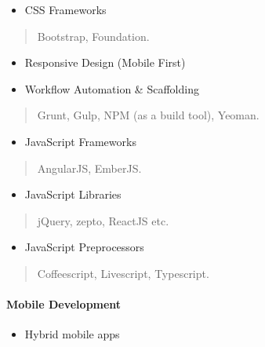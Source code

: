 \documentclass[]{article}
\providecommand{\tightlist}{%
  \setlength{\itemsep}{0pt}\setlength{\parskip}{0pt}}
\let\oldparagraph\paragraph
\renewcommand{\paragraph}[1]{\oldparagraph{#1}\mbox{}}
\begin{document}
\begin{itemize}
\tightlist
\item
  CSS Frameworks
\end{itemize}

\begin{quote}
Bootstrap, Foundation.
\end{quote}

\begin{itemize}
\item
  Responsive Design (Mobile First)
\item
  Workflow Automation \& Scaffolding
\end{itemize}

\begin{quote}
Grunt, Gulp, NPM (as a build tool), Yeoman.
\end{quote}

\begin{itemize}
\tightlist
\item
  JavaScript Frameworks
\end{itemize}

\begin{quote}
AngularJS, EmberJS.
\end{quote}

\begin{itemize}
\tightlist
\item
  JavaScript Libraries
\end{itemize}

\begin{quote}
jQuery, zepto, ReactJS etc.
\end{quote}

\begin{itemize}
\tightlist
\item
  JavaScript Preprocessors
\end{itemize}

\begin{quote}
Coffeescript, Livescript, Typescript.
\end{quote}

\paragraph{Mobile Development}\label{mobile-development}

\begin{itemize}
\tightlist
\item
  Hybrid mobile apps
\end{itemize}
\end{document}
